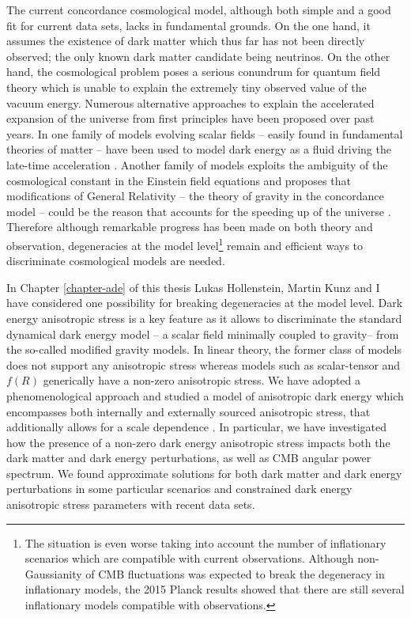 The current concordance cosmological model, although both simple and a good fit for current data sets, lacks in fundamental grounds. On the one hand, it assumes the existence of dark matter which thus far has not been directly observed; the only known dark matter candidate being neutrinos. On the other hand, the cosmological problem poses a serious conundrum for quantum field theory which is unable to explain the extremely tiny observed value of the vacuum energy. Numerous alternative approaches to explain the accelerated expansion of the universe from first principles have been proposed over past years. In one family of models evolving scalar fields -- easily found in fundamental theories of matter -- have been used to model dark energy as a fluid driving the late-time acceleration \cite{Copeland:2006wr}. Another family of models exploits the ambiguity of the cosmological constant in the Einstein field equations and proposes that modifications of General Relativity -- the theory of gravity in the concordance model -- could be the reason that accounts for the speeding up of the universe \cite{Clifton:2011jh}. Therefore although remarkable progress has been made on both theory and observation, degeneracies at the model level\footnote{The situation is even worse taking into account the number of inflationary scenarios which are compatible with current observations. Although non-Gaussianity of CMB fluctuations was expected to break the degeneracy in inflationary models, the 2015 Planck results \cite{Ade:2015ava,Ade:2015lrj} showed that there are still several inflationary models compatible with observations.} remain and efficient ways to discriminate cosmological models are needed.   

In Chapter \ref{chapter-ade} of this thesis Lukas Hollenstein, Martin Kunz and I have considered one possibility for breaking degeneracies at the model level. Dark energy anisotropic stress is a key feature as it allows to discriminate the standard dynamical dark energy model -- a scalar field minimally coupled to gravity-- from the so-called modified gravity models. In linear theory, the former class of models does not support any anisotropic stress whereas models such as scalar-tensor and $f(R)$ generically have a non-zero anisotropic stress. We have adopted a phenomenological approach and studied a model of anisotropic dark energy which encompasses both internally and externally sourced anisotropic stress, that additionally allows for a scale dependence \cite{Cardona:2014iba}. In particular, we have investigated how the presence of a non-zero dark energy anisotropic stress impacts both the dark matter and dark energy perturbations, as well as CMB angular power spectrum. We found approximate solutions for both dark matter and dark energy perturbations in some particular scenarios and constrained dark energy anisotropic stress parameters with recent data sets. 

